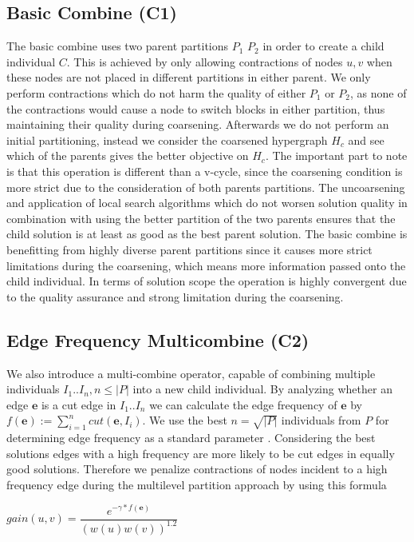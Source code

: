 \documentclass[a4paper,12pt,bibtotoc,titlepage, liststotoc,BCOR7mm,headsepline,pointlessnumbers]{scrbook}
\numberwithin{equation}{section}
\begin{document}
\subsection{Basic Combine (C1)}
\label{sec:basiccombine}
The basic combine uses two parent partitions $P_1$ $P_2$ in order to create a child individual $C$. This is achieved by only allowing contractions of nodes $u, v$ when these nodes are not placed in different partitions in either parent. We only perform contractions which do not harm the quality of either $P_1$ or $P_2$, as none of the contractions would cause a node to switch blocks in either partition, thus maintaining their quality during coarsening. 
Afterwards we do not perform an initial partitioning, instead we consider the coarsened hypergraph $H_c$ and see which of the parents gives the better objective on $H_c$.
The important part to note is that this operation is different than a v-cycle, since the coarsening condition is more strict due to the consideration of both parents partitions. The uncoarsening and application of local search algorithms which do not worsen solution quality in combination with using the better partition of the two parents ensures that the child solution is at least as good as the best parent solution. \label{qualityassurance} The basic combine is benefitting from highly diverse parent partitions since it causes more strict limitations during the coarsening, which means more information passed onto the child individual. In terms of solution scope the operation is highly convergent due to the quality assurance and strong limitation during the coarsening. 


\subsection{Edge Frequency Multicombine (C2)}
\label{sec:edgefrequency}
We also introduce a multi-combine operator, capable of combining multiple individuals $I_1.. I_n, n \le |P|$ into a new child individual. By analyzing whether an edge $\textbf{e}$ is a cut edge in $I_1 ..I_n$ we can calculate the edge frequency \cite{wichlund1998multilevel} of $\textbf{e}$ by $f(\textbf{e}) := \sum_{i=1}^n cut(\textbf{e},I_i)$. We use the best $n = \sqrt{|P|}$ individuals from $P$ for determining edge frequency as a standard parameter \cite{delling2011graph}. Considering the best solutions edges with a high frequency are more likely to be cut edges in equally good solutions. Therefore we penalize contractions of nodes incident to a high frequency edge during the multilevel partition approach by using this formula
\begin{center}
$gain(u,v) = \dfrac{e^{-\gamma*f(\textbf{e})}}{(w(u)w(v))^{1.2}}$ 
\end{center}
\end{document}
